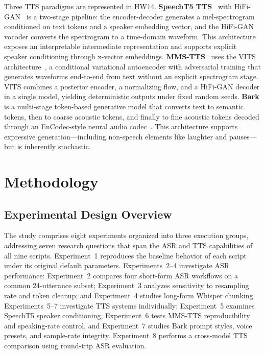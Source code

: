 \documentclass[conference]{IEEEtran}
\begin{document}
Three TTS paradigms are represented in HW14. \textbf{SpeechT5 TTS}~\cite{ao2022} with HiFi-GAN~\cite{kong2020} is a two-stage pipeline: the encoder-decoder generates a mel-spectrogram conditioned on text tokens and a speaker embedding vector, and the HiFi-GAN vocoder converts the spectrogram to a time-domain waveform. This architecture exposes an interpretable intermediate representation and supports explicit speaker conditioning through x-vector embeddings. \textbf{MMS-TTS}~\cite{pratap2023} uses the VITS architecture~\cite{kim2021}, a conditional variational autoencoder with adversarial training that generates waveforms end-to-end from text without an explicit spectrogram stage. VITS combines a posterior encoder, a normalizing flow, and a HiFi-GAN decoder in a single model, yielding deterministic outputs under fixed random seeds. \textbf{Bark} is a multi-stage token-based generative model that converts text to semantic tokens, then to coarse acoustic tokens, and finally to fine acoustic tokens decoded through an EnCodec-style neural audio codec~\cite{defossez2022}. This architecture supports expressive generation---including non-speech elements like laughter and pauses---but is inherently stochastic.

\section{Methodology}
\label{sec:methodology}

\subsection{Experimental Design Overview}

The study comprises eight experiments organized into three execution groups, addressing seven research questions that span the ASR and TTS capabilities of all nine scripts. Experiment~1 reproduces the baseline behavior of each script under its original default parameters. Experiments~2--4 investigate ASR performance: Experiment~2 compares four short-form ASR workflows on a common 24-utterance subset; Experiment~3 analyzes sensitivity to resampling rate and token cleanup; and Experiment~4 studies long-form Whisper chunking. Experiments~5--7 investigate TTS systems individually: Experiment~5 examines SpeechT5 speaker conditioning, Experiment~6 tests MMS-TTS reproducibility and speaking-rate control, and Experiment~7 studies Bark prompt styles, voice presets, and sample-rate integrity. Experiment~8 performs a cross-model TTS comparison using round-trip ASR evaluation.
\end{document}

